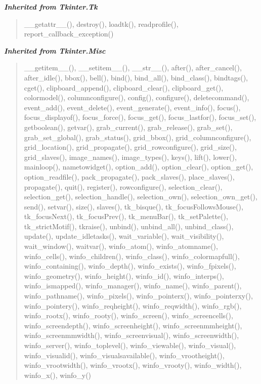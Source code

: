 \large{\textbf{\textit{Inherited from Tkinter.Tk}}}

\begin{quote}
\_\_getattr\_\_(), destroy(), loadtk(), readprofile(), report\_callback\_exception()
\end{quote}

\large{\textbf{\textit{Inherited from Tkinter.Misc}}}

\begin{quote}
\_\_getitem\_\_(), \_\_setitem\_\_(), \_\_str\_\_(), after(), after\_cancel(), after\_idle(), bbox(), bell(), bind(), bind\_all(), bind\_class(), bindtags(), cget(), clipboard\_append(), clipboard\_clear(), clipboard\_get(), colormodel(), columnconfigure(), config(), configure(), deletecommand(), event\_add(), event\_delete(), event\_generate(), event\_info(), focus(), focus\_displayof(), focus\_force(), focus\_get(), focus\_lastfor(), focus\_set(), getboolean(), getvar(), grab\_current(), grab\_release(), grab\_set(), grab\_set\_global(), grab\_status(), grid\_bbox(), grid\_columnconfigure(), grid\_location(), grid\_propagate(), grid\_rowconfigure(), grid\_size(), grid\_slaves(), image\_names(), image\_types(), keys(), lift(), lower(), mainloop(), nametowidget(), option\_add(), option\_clear(), option\_get(), option\_readfile(), pack\_propagate(), pack\_slaves(), place\_slaves(), propagate(), quit(), register(), rowconfigure(), selection\_clear(), selection\_get(), selection\_handle(), selection\_own(), selection\_own\_get(), send(), setvar(), size(), slaves(), tk\_bisque(), tk\_focusFollowsMouse(), tk\_focusNext(), tk\_focusPrev(), tk\_menuBar(), tk\_setPalette(), tk\_strictMotif(), tkraise(), unbind(), unbind\_all(), unbind\_class(), update(), update\_idletasks(), wait\_variable(), wait\_visibility(), wait\_window(), waitvar(), winfo\_atom(), winfo\_atomname(), winfo\_cells(), winfo\_children(), winfo\_class(), winfo\_colormapfull(), winfo\_containing(), winfo\_depth(), winfo\_exists(), winfo\_fpixels(), winfo\_geometry(), winfo\_height(), winfo\_id(), winfo\_interps(), winfo\_ismapped(), winfo\_manager(), winfo\_name(), winfo\_parent(), winfo\_pathname(), winfo\_pixels(), winfo\_pointerx(), winfo\_pointerxy(), winfo\_pointery(), winfo\_reqheight(), winfo\_reqwidth(), winfo\_rgb(), winfo\_rootx(), winfo\_rooty(), winfo\_screen(), winfo\_screencells(), winfo\_screendepth(), winfo\_screenheight(), winfo\_screenmmheight(), winfo\_screenmmwidth(), winfo\_screenvisual(), winfo\_screenwidth(), winfo\_server(), winfo\_toplevel(), winfo\_viewable(), winfo\_visual(), winfo\_visualid(), winfo\_visualsavailable(), winfo\_vrootheight(), winfo\_vrootwidth(), winfo\_vrootx(), winfo\_vrooty(), winfo\_width(), winfo\_x(), winfo\_y()
\end{quote}

